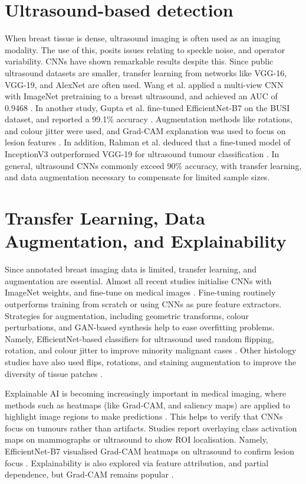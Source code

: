 \documentclass[../main]{subfiles}
\begin{document}
\section{Ultrasound-based detection}
\label{sec:ultrasound-cnn}
When breast tissue is dense, ultrasound imaging is often used as an imaging modality. The use of this, posits issues relating to speckle noise, and operator variability. CNNs have shown remarkable results despite this. Since public ultrasound datasets are smaller, transfer learning from networks like VGG-16, VGG-19, and AlexNet are often used. Wang et al. applied a multi-view CNN with ImageNet pretraining to a breast ultrasound, and achieved an AUC of 0.9468 \autocite{wang2024mammography}. In another study, Gupta et al. fine-tuned EfficientNet-B7 on the BUSI dataset, and reported a 99.1\% accuracy \autocite{latha2024revolutionizing}. Augmentation methods like rotations, and colour jitter were used, and Grad-CAM explanation was used to focus on lesion features \autocite{latha2024revolutionizing}. In addition, Rahman et al. deduced that a fine-tuned model of InceptionV3 outperformed VGG-19 for ultrasound tumour classification \autocite{ayana2021transfer}. In general, ultrasound CNNs commonly exceed 90\% accuracy, with transfer learning, and data augmentation necessary to compensate for limited sample sizes.

\section{Transfer Learning, Data Augmentation, and Explainability}
\label{sec:transfer-learning}
Since annotated breast imaging data is limited, transfer learning, and augmentation are essential. Almost all recent studies initialise CNNs with ImageNet weights, and fine-tune on medical images \autocite{srikantamurthy2023classification}. Fine-tuning routinely outperforms training from scratch or using CNNs as pure feature extractors. Strategies for augmentation, including geometric transforms, colour perturbations, and GAN-based synthesis help to ease overfitting problems. Namely, EfficientNet-based classifiers for ultrasound used random flipping, rotation, and colour jitter to improve minority malignant cases \autocite{latha2024revolutionizing}. Other histology studies have also used flips, rotations, and staining augmentation to improve the diversity of tissue patches \autocite{srikantamurthy2023classification}.

Explainable AI is becoming increasingly important in medical imaging, where methods such as heatmaps (like Grad-CAM, and saliency maps) are applied to highlight image regions to make predictions \autocite{latha2024revolutionizing} \autocite{kaba2024explainable}. This helps to verify that CNNs focus on tumours rather than artifacts. Studies report overlaying class activation maps on mammographs or ultrasound to show ROI localisation. Namely, EfficientNet-B7 visualised Grad-CAM heatmaps on ultrasound to confirm lesion focus \autocite{latha2024revolutionizing}. Explainability is also explored via feature attribution, and partial dependence, but Grad-CAM remains popular \autocite{latha2024revolutionizing} \autocite{kaba2024explainable}.
\end{document}
